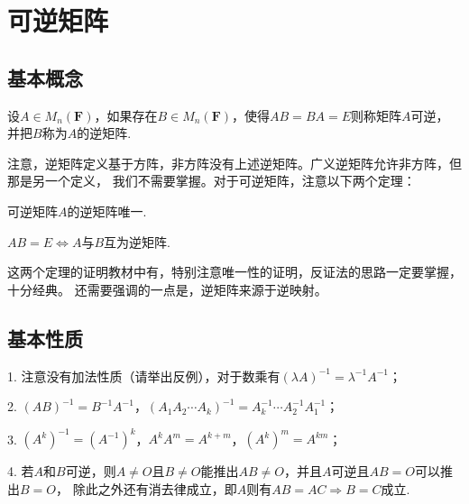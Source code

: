 \section{可逆矩阵}
\subsection{基本概念}
\begin{definition}
	设$A \in M_n(\mathbf{F})$，如果存在$B \in M_n(\mathbf{F})$，使得$AB=BA=E$则称矩阵$A$可逆，
	并把$B$称为$A$的逆矩阵.
\end{definition}
注意，逆矩阵定义基于方阵，非方阵没有上述逆矩阵。广义逆矩阵允许非方阵，但那是另一个定义，
我们不需要掌握。对于可逆矩阵，注意以下两个定理：
\begin{theorem}
	可逆矩阵$A$的逆矩阵唯一.
\end{theorem}
\begin{theorem}
	$AB=E \iff A$与$B$互为逆矩阵.
\end{theorem}
这两个定理的证明教材中有，特别注意唯一性的证明，反证法的思路一定要掌握，十分经典。
还需要强调的一点是，逆矩阵来源于逆映射。
\subsection{基本性质}
1. 注意没有加法性质（请举出反例），对于数乘有$(\lambda A)^{-1}=\lambda^{-1}A^{-1}$；

2. $(AB)^{-1}=B^{-1}A^{-1}$，$(A_1A_2\cdots A_k)^{-1}=A_k^{-1}\cdots A_2^{-1}A_1^{-1}$；

3. $(A^k)^{-1}=(A^{-1})^k$，$A^kA^m=A^{k+m}$，$(A^k)^m=A^{km}$；

4. 若$A$和$B$可逆，则$A\neq O$且$B\neq O$能推出$AB\neq O$，并且$A$可逆且$AB=O$可以推出$B=O$，
除此之外还有消去律成立，即$A$则有$AB=AC \Rightarrow B=C$成立.

